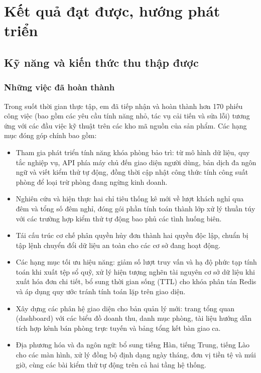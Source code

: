 \section{Kết quả đạt được, hướng phát triển}

\subsection{Kỹ năng và kiến thức thu thập được}

\subsubsection{Những việc đã hoàn thành}

Trong suốt thời gian thực tập, em đã tiếp nhận và hoàn thành hơn 170 phiếu công việc (bao gồm các yêu cầu tính năng nhỏ, tác vụ cải tiến và sửa lỗi) tương ứng với các đầu việc kỹ thuật trên các kho mã nguồn của sản phẩm. Các hạng mục đóng góp chính bao gồm:

\begin{itemize}[leftmargin=1.2cm, itemsep=1pt, topsep=2pt]
\item Tham gia phát triển tính năng khóa phòng bảo trì: từ mô hình dữ liệu, quy tắc nghiệp vụ, API phía máy chủ đến giao diện người dùng, bản dịch đa ngôn ngữ và viết kiểm thử tự động, đồng thời cập nhật công thức tính công suất phòng để loại trừ phòng đang ngừng kinh doanh.
\item Nghiên cứu và hiện thực hai chỉ tiêu thống kê mới về lượt khách nghỉ qua đêm và tổng số đêm nghỉ, đóng gói phần tính toán thành lớp xử lý thuần túy với các trường hợp kiểm thử tự động bao phủ các tình huống biên.
\item Tái cấu trúc cơ chế phân quyền hủy đơn thành hai quyền độc lập, chuẩn bị tập lệnh chuyển đổi dữ liệu an toàn cho các cơ sở đang hoạt động.
\item Các hạng mục tối ưu hiệu năng: giảm số lượt truy vấn và hạ độ phức tạp tính toán khi xuất tệp sổ quỹ, xử lý hiện tượng nghẽn tài nguyên cơ sở dữ liệu khi xuất hóa đơn chi tiết, bổ sung thời gian sống (TTL) cho khóa phân tán Redis và áp dụng quy ước tránh tính toán lặp trên giao diện.
\item Xây dựng các phân hệ giao diện cho bản quản lý mới: trang tổng quan (dashboard) với các biểu đồ doanh thu, danh mục phòng, tài liệu hướng dẫn tích hợp kênh bán phòng trực tuyến và bảng tổng kết bàn giao ca.
\item Địa phương hóa và đa ngôn ngữ: bổ sung tiếng Hàn, tiếng Trung, tiếng Lào cho các màn hình, xử lý đồng bộ định dạng ngày tháng, đơn vị tiền tệ và múi giờ, cùng các bài kiểm thử tự động trên cả hai tầng hệ thống.
\end{itemize}

